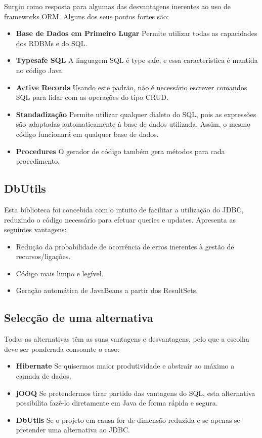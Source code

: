 Surgiu como resposta para algumas das desvantagens inerentes ao uso de frameworks ORM. Alguns dos seus pontos fortes são:
\begin{itemize}
\item \textbf{Base de Dados em Primeiro Lugar} Permite utilizar todas as capacidades dos RDBMs e do SQL.
\item \textbf{Typesafe SQL} A linguagem SQL é type safe, e essa característica é mantida no código Java.
\item \textbf{Active Records} Usando este padrão, não é necessário escrever comandos SQL para lidar com as operações do tipo CRUD.
\item \textbf{Standadização} Permite utilizar qualquer dialeto do SQL, pois as expressões são adaptadas automaticamente à base de dados utilizada. Assim, o mesmo código funcionará em qualquer base de dados.
\item \textbf{Procedures} O gerador de código também gera métodos para cada procedimento.
\end{itemize}

\subsection{DbUtils}

Esta biblioteca foi concebida com o intuito de facilitar a utilização do JDBC, reduzindo o código necessário para efetuar queries e updates. Apresenta as seguintes vantagens:
\begin{itemize}
\item Redução da probabilidade de ocorrência de erros inerentes à gestão de recursos/ligações.
\item Código mais limpo e legível.
\item Geração automática de JavaBeans a partir dos ResultSets.
\end{itemize}

\subsection{Selecção de uma alternativa}

Todas as alternativas têm as suas vantagens e desvantagens, pelo que a escolha deve ser ponderada consoante o caso:
\begin{itemize}
\item \textbf{Hibernate} Se quisermos maior produtividade e abstrair ao máximo a camada de dados.
\item \textbf{jOOQ} Se pretendermos tirar partido das vantagens do SQL, esta alternativa possibilita fazê-lo diretamente em Java de forma rápida e segura.
\item \textbf{DbUtils} Se o projeto em causa for de dimensão reduzida e se apenas se pretender uma alternativa ao JDBC.
\end{itemize}


